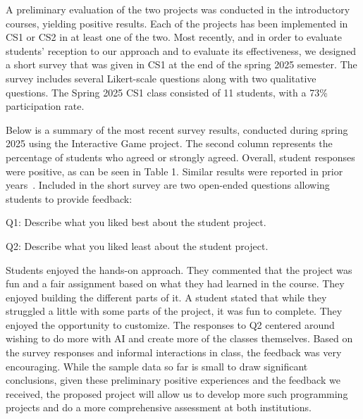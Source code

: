 A preliminary evaluation of the two projects was conducted in the introductory courses, yielding positive results. Each of the projects has been implemented in CS1 or CS2 in at least one of the two. Most recently, and in order to evaluate students’ reception to our approach and to evaluate its effectiveness, we designed a short survey that was given in CS1 at the end of the spring 2025 semester. The survey includes several Likert-scale questions along with two qualitative questions. The Spring 2025 CS1 class consisted of 11 students, with a 73\% participation rate. 

Below is a summary of the most recent survey results, conducted during spring 2025 using the Interactive Game project. The second column represents the percentage of students who agreed or strongly agreed. Overall, student responses were positive, as can be seen in Table 1. Similar results were reported in prior years~\cite{neller2008throw}. 
Included in the short survey are two open-ended questions allowing students to provide feedback:

Q1: Describe what you liked best about the student project.

Q2: Describe what you liked least about the student project.

Students enjoyed the hands-on approach. They commented that the project was fun and a fair assignment based on what they had learned in the course. They enjoyed building the different parts of it. A student stated that while they struggled a little with some parts of the project, it was fun to complete. They enjoyed the opportunity to customize. 
The responses to Q2 centered around wishing to do more with AI and create more of the classes themselves.  
Based on the survey responses and informal interactions in class, the feedback was very encouraging.  While the sample data so far is small to draw significant conclusions, given these preliminary positive experiences and the feedback we received, the proposed project will allow us to develop more such programming projects and do a more comprehensive assessment at both institutions.
